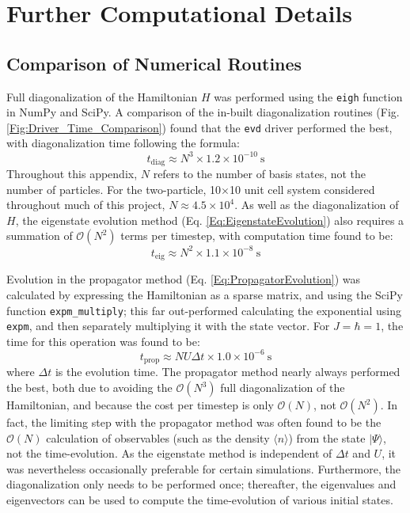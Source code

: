\chapter{Further Computational Details}\label{App:Timing}

\section{Comparison of Numerical Routines}\label{App:NumericalRoutines}
Full diagonalization of the Hamiltonian $H$ was performed using the \texttt{eigh} function in NumPy and SciPy. A comparison of the in-built diagonalization routines (Fig. \ref{Fig:Driver_Time_Comparison}) found that the \texttt{evd} driver performed the best, with diagonalization time following the formula:
\begin{equation}\label{Eq:DiagTime}
    t_{\text{diag}}\approx N^3 \times 1.2 \times 10^{-10}\: \text{s}
\end{equation}
Throughout this appendix, $N$ refers to the number of basis states, not the number of particles. For the two-particle, 10$\times$10 unit cell system considered throughout much of this project, $N\approx 4.5 \times 10^4$. As well as the diagonalization of $H$, the eigenstate evolution method (Eq. \ref{Eq:EigenstateEvolution}) also requires a summation of $\mathcal{O}(N^2)$ terms per timestep, with computation time found to be:
\begin{equation}\label{Eq:EigenstateEvolutionTime}
    t_{\text{eig}}\approx N^2 \times 1.1 \times 10^{-8}\: \text{s}
\end{equation}

Evolution in the propagator method (Eq. \ref{Eq:PropagatorEvolution}) was calculated by expressing the Hamiltonian as a sparse matrix, and using the SciPy function \texttt{expm\_multiply}; this far out-performed calculating the exponential using \texttt{expm}, and then separately multiplying it with the state vector. For $J=\hbar=1$, the time for this operation was found to be:
\begin{equation}\label{Eq:PropTime}
    t_{\text{prop}}\approx  N U\Delta t \times 1.0 \times 10^{-6}\: \text{s}
\end{equation}
where $\Delta t$ is the evolution time. The propagator method nearly always performed the best, both due to avoiding the $\mathcal{O}(N^3)$ full diagonalization of the Hamiltonian, and because the cost per timestep is only $\mathcal{O}(N)$, not $\mathcal{O}(N^2)$. In fact, the limiting step with the propagator method was often found to be the $\mathcal{O}(N)$ calculation of observables (such as the density $\langle n \rangle$) from the state $|\Psi\rangle$, not the time-evolution. As the eigenstate method is independent of $\Delta t$ and $U$, it was nevertheless occasionally preferable for certain simulations. Furthermore, the diagonalization only needs to be performed once; thereafter, the eigenvalues and eigenvectors can be used to compute the time-evolution of various initial states.

